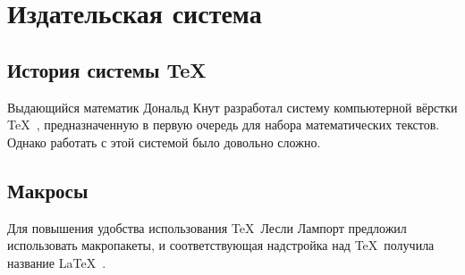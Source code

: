 
\section{Издательская система \LaTeXe}

\subsection{История системы \TeX}

Выдающийся математик Дональд Кнут разработал систему компьютерной вёрстки \TeX\ \cite{lvovskiy}, предназначенную в первую очередь для набора математических текстов. Однако работать с этой системой было довольно сложно.

\subsection{Макросы}
Для повышения удобства использования \TeX\ Лесли Лампорт предложил использовать макропакеты, и соответствующая надстройка над \TeX\ получила название \LaTeX\ \cite{kotelnikov}.